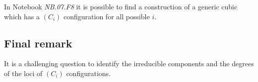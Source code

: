 \documentclass[a4paper, 11pt, reqno]{amsart}
\theoremstyle{plain}
\theoremstyle{definition}
\newcommand{\nb}[2]{\textsl{{NB}.{#1}.{#2}}}
\begin{document}
\medskip
In Notebook \nb{07}{F8} it is possible to find a construction of a 
generic cubic which has a $(C_i)$ configuration for all possible $i$.

\subsection*{Final remark} It is a challenging question to identify the irreducible components and the degrees of the loci of $(C_i)$ configurations.




\end{document}

